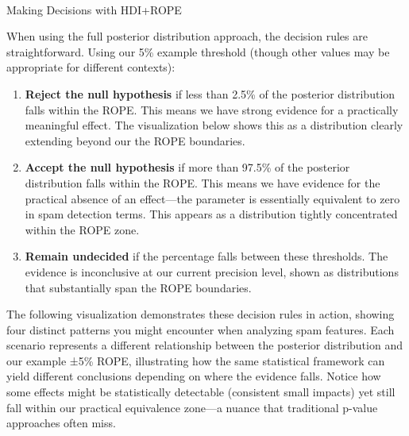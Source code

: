 \documentclass[
  letterpaper,
  DIV=11,
  numbers=noendperiod]{scrartcl}
\makeatletter
\let\oldparagraph\paragraph
\renewcommand{\paragraph}{
    \@ifstar
      \xxxParagraphStar
      \xxxParagraphNoStar
  }
\newcommand{\xxxParagraphStar}[1]{\oldparagraph*{#1}\mbox{}}
\newcommand{\xxxParagraphNoStar}[1]{\oldparagraph{#1}\mbox{}}
\makeatother
\begin{document}
\paragraph{Making Decisions with
HDI+ROPE}\label{making-decisions-with-hdirope}

When using the full posterior distribution approach, the decision rules
are straightforward. Using our 5\% example threshold (though other
values may be appropriate for different contexts):

\begin{enumerate}
\def\labelenumi{\arabic{enumi}.}
\item
  \textbf{Reject the null hypothesis} if less than 2.5\% of the
  posterior distribution falls within the ROPE. This means we have
  strong evidence for a practically meaningful effect. The visualization
  below shows this as a distribution clearly extending beyond our the
  ROPE boundaries.
\item
  \textbf{Accept the null hypothesis} if more than 97.5\% of the
  posterior distribution falls within the ROPE. This means we have
  evidence for the practical absence of an effect---the parameter is
  essentially equivalent to zero in spam detection terms. This appears
  as a distribution tightly concentrated within the ROPE zone.
\item
  \textbf{Remain undecided} if the percentage falls between these
  thresholds. The evidence is inconclusive at our current precision
  level, shown as distributions that substantially span the ROPE
  boundaries.
\end{enumerate}

The following visualization demonstrates these decision rules in action,
showing four distinct patterns you might encounter when analyzing spam
features. Each scenario represents a different relationship between the
posterior distribution and our example ±5\% ROPE, illustrating how the
same statistical framework can yield different conclusions depending on
where the evidence falls. Notice how some effects might be statistically
detectable (consistent small impacts) yet still fall within our
practical equivalence zone---a nuance that traditional p-value
approaches often miss.
\end{document}
